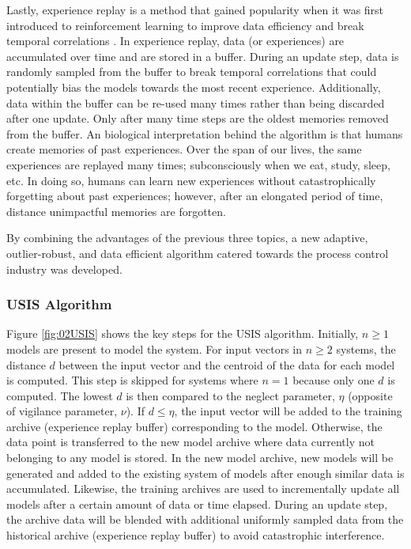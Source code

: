 Lastly, experience replay is a method that gained popularity when it was first introduced to reinforcement learning to improve data efficiency and break temporal correlations \cite{dqn}. In experience replay, data (or experiences) are accumulated over time and are stored in a buffer.  During an update step, data is randomly sampled from the buffer to break temporal correlations that could potentially bias the models towards the most recent experience.  Additionally, data within the buffer can be re-used many times rather than being discarded after one update. Only after many time steps are the oldest memories removed from the buffer. An biological interpretation behind the algorithm is that humans create memories of past experiences.  Over the span of our lives, the same experiences are replayed many times; subconsciously when we eat, study, sleep, etc.  In doing so, humans can learn new experiences without catastrophically forgetting about past experiences; however, after an elongated period of time, distance unimpactful memories are forgotten.

By combining the advantages of the previous three topics, a new adaptive, outlier-robust, and data efficient algorithm catered towards the process control industry was developed.

\subsubsection{USIS Algorithm}

Figure \ref{fig:02USIS} shows the key steps for the USIS algorithm.  Initially, $n \geq 1$ models are present to model the system.  For input vectors in $n \geq 2$ systems, the distance $d$ between the input vector and the centroid of the data for each model is computed. This step is skipped for systems where $n = 1$ because only one $d$ is computed. The lowest $d$ is then compared to the neglect parameter, $\eta$ (opposite of vigilance parameter, $\nu$).  If $d \leq \eta$, the input vector will be added to the training archive (experience replay buffer) corresponding to the model.  Otherwise, the data point is transferred to the new model archive where data currently not belonging to any model is stored. In the new model archive, new models will be generated and added to the existing system of models after enough similar data is accumulated. Likewise, the training archives are used to incrementally update all models after a certain amount of data or time elapsed. During an update step, the archive data will be blended with additional uniformly sampled data from the historical archive (experience replay buffer) to avoid catastrophic interference. 

